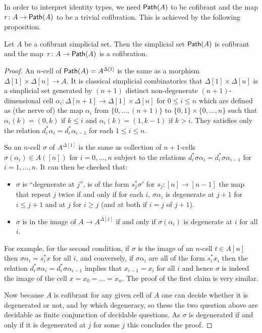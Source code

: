 \documentclass[reqno,10pt,a4paper,oneside,draft]{amsart}
\begin{document}
In order to interpret identity types, we need $\mathsf{Path}(A)$ to be cofibrant and the map $r \colon A \rightarrow \mathsf{Path}(A)$ to be a trivial cofibration. This is achieved by the following proposition.

\begin{proposition}\label{proposition:PathObjectCofibrant}
Let $A$ be a cofibrant simplicial set. Then the simplicial set $\mathsf{Path}(A)$ is cofibrant and the map~$r \colon A \rightarrow \mathsf{Path}(A)$ is a cofibration.
\end{proposition}



\begin{proof}
An $n$-cell of $\mathsf{Path}(A) = A^{\Delta[1]}$ is the same as a morphism $\Delta[1] \times \Delta[n] \rightarrow A$. It is classical simplicial combinatorics that $\Delta[1] \times \Delta[n]$ is a simplicial set generated by $(n+1)$ distinct non-degenerate $(n+1)$-dimensional cell $\alpha_i: \Delta[n+1] \rightarrow \Delta[1] \times \Delta[n]$ for $0 \leqslant i \leqslant n$ which are defined as (the nerve of) the map $\alpha_i$ from $\{0,\dots,(n+1)\}$ to $\{0,1\} \times \{0,\dots,n\}$ such that $\alpha_i(k)=(0,k)$ if $k \leqslant i$ and $\alpha_i(k)=(1,k-1)$ if $k>i$. They satisfies only the relation $d_i^* \alpha_i = d_{i}^* \alpha_{i-1}$ for each $1 \leqslant i \leqslant n$.

So an $n$-cell $\sigma$ of $A^{\Delta[1]}$ is the same as collection of $n+1$-cells $\sigma(\alpha_i) \in A([n])$ for $i=0,\dots,n$ subject to the relations $d_i^* \sigma \alpha_i = d_{i}^* \sigma \alpha_{i-1}$ for $i=1,\dots,n$. It can then be checked that:
\begin{itemize}
\item $\sigma$ is ``degenerate at $j$'', \ie is of the form $s_j ^* \sigma'$ for $s_j : [n] \rightarrow [n-1]$ the map that repeat $j$ twice if and only if for each $i$, $\sigma \alpha_i $ is degenerate at $j+1$ for $i \leqslant j+1$ and at $j$ for $i \geqslant j$ (and at both if $i=j$ of $j+1$).
\item $\sigma$ is in the image of $A \rightarrow A^{\Delta[1]}$ if and only if $\sigma(\alpha_i)$ is degenerate at $i$ for all $i$.
\end{itemize}


For example, for the second condition, if $\sigma$ is the image of an $n$-cell $t \in A[n]$ then $\sigma \alpha_i = s_i^* x$ for all $i$, and conversely, if $\sigma \alpha_i$ are all of the form $s_i^* x_i$ then the relation $d_i^* \sigma \alpha_i = d_{i}^* \sigma \alpha_{i-1}$ implies that $x_{i-1}=x_i$ for all $i$ and hence $\sigma$ is indeed the image of the cell $x=x_0= \dots = x_n$. The proof of the first claim is very similar.

Now because $A$ is cofibrant for any given cell of $A$ one can decide whether it is degenerated or not, and by which degeneracy, so these the two question above are decidable as finite conjunction of decidable questions. As $\sigma$ is degenerated if and only if it is degenerated at $j$ for some $j$ this concludes the proof.
\end{proof}
\end{document}
